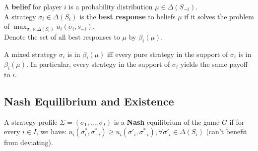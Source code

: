 \documentclass[11pt]{elegantbook}
\begin{document}
\begin{definition}
    \normalfont
    A \textbf{belief} for player $i$ is a probability distribution $\mu\in\Delta(S_{-i})$.\\
    A strategy $\sigma_i \in \Delta(S_i)$ is the \textbf{best response} to beliefs $\mu$ if it solves the problem of $\max_{\sigma_i\in\Delta(S_i)}u_i(\sigma_i,s_{-i})$.\\
    Denote the set of all best responses to $\mu$ by $\beta_i(\mu)$.
\end{definition}
\begin{lemma}
    A mixed strategy $\sigma_i$ is in $\beta_i(\mu)$ iff every pure strategy in the support of $\sigma_i$ is in $\beta_i(\mu)$. In particular, every strategy in the support of $\sigma_i$ yields the same payoff to $i$.
\end{lemma}

\subsection{Nash Equilibrium and Existence}
\begin{definition}
    \normalfont
    A strategy profile $\Sigma=(\sigma_1,...,\sigma_I)$ is a \textbf{Nash} equilibrium of the game $G$ if for every $i\in I$, we have: $u_i(\sigma^*_i,\sigma^*_{-i})\geq u_i(\sigma'_i,\sigma^*_{-i}), \forall \sigma'_i\in \Delta(S_i)$ (can't benefit from deviating).
\end{definition}
\end{document}
